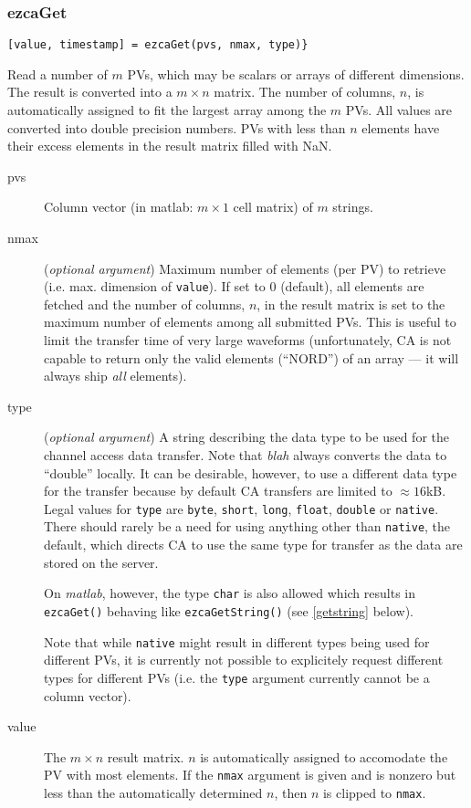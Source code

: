 \documentclass{article}
\newcommand{\sca}{{\em blah}}
\newcommand{\matlab}{{\em matlab}}
\newcommand{\com}[1]{{\tt #1}}
\newcommand{\NAN}{\mbox{NaN}}
\newcommand{\PVITEM}{
\item[pvs] Column vector (in matlab: $m\times 1$ cell matrix)
of $m$ strings.
}
\begin{document}
\subsubsection{ezcaGet}
\label{ezcaget}
\begin{verbatim}
[value, timestamp] = ezcaGet(pvs, nmax, type)}
\end{verbatim}
Read a number of $m$ PVs, which may be scalars or arrays of
different dimensions. The result is converted into a $m\times n$
matrix. The number of columns, $n$, is automatically assigned
to fit the largest array among the $m$ PVs. All values are
converted into double precision numbers. PVs with less than
$n$ elements have their excess elements in the result matrix
filled with \NAN.
\begin{description}
\PVITEM
%
%
\item[nmax] ({\em optional argument}) Maximum number of elements
(per PV) to retrieve (i.e. max. dimension of \com{value}).
If set to 0 (default), all elements are fetched
and the number of columns, $n$, in the result matrix is set to the
maximum number of elements among all submitted PVs. This is useful
to limit the transfer time of very large waveforms (unfortunately,
CA is not capable to return only the valid elements (``NORD'') of
an array --- it will always ship {\em all} elements).
%
%
\item[type] ({\em optional argument}) A string describing the
data type to be used for the channel access data transfer. Note
that \sca{} always converts the data to ``double'' locally. It
can be desirable, however, to use a different data type for the
transfer because by default CA transfers are limited to $\approx 16$kB.
Legal values for \com{type}{} are \com{byte}, \com{short}, \com{long},
\com{float}, \com{double} or \com{native}. There should rarely
be a need for using anything other than \com{native}, the default,
which directs CA to use the same type for transfer as the data are
stored on the server.

On \matlab{}{}, however, the type \com{char}{} is also allowed which
results in \com{ezcaGet()}{} behaving like \com{ezcaGetString()}{}
(see \ref{getstring} below).

Note that while \com{native}{} might result in different types
being used for different PVs, it is currently not possible to
explicitely request different types for different PVs (i.e. the
\com{type}{} argument currently cannot be a column vector).
%
%
\item[value] The $m\times n$ result matrix. $n$ is automatically
assigned to accomodate the PV with most elements. If the \com{nmax}{}
argument is given and is nonzero but less than the automatically
determined $n$, then $n$ is clipped to \com{nmax}.


\end{description}
\end{document}
